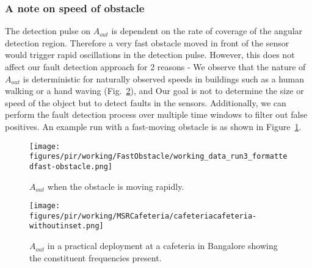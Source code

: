 \subsubsection{A note on speed of obstacle} The detection pulse on $A_{out}$ is dependent on the rate of coverage of the angular detection region. Therefore a very fast obstacle moved in front of the sensor would trigger rapid oscillations in the detection pulse. However, this does not affect our fault detection approach for 2 reasons - \ci We observe that the nature of $A_{out}$ is deterministic for naturally observed speeds in buildings such as a human walking or a hand waving (\eg Fig.~\ref{fig:msr_cafeteria}), and \cii Our goal is not to determine the size or speed of the object but to detect faults in the sensors. Additionally, we can perform the fault detection process over multiple time windows to filter out false positives. An example run with a fast-moving obstacle is as shown in Figure~\ref{fig:pir_sensor_fast_obstacle}. 

\begin{figure}
\centering
\texttt{[image: figures/pir/working/FastObstacle/working\_data\_run3\_formattedfast-obstacle.png]}
\caption{$A_{out}$ when the obstacle is moving rapidly.}
\label{fig:pir_sensor_fast_obstacle}
\end{figure}

\begin{figure}
\centering
\texttt{[image: figures/pir/working/MSRCafeteria/cafeteriacafeteria-withoutinset.png]}
\caption{$A_{out}$ in a practical deployment at a cafeteria in Bangalore showing the constituent frequencies present.}
\label{fig:msr_cafeteria}
\end{figure}





